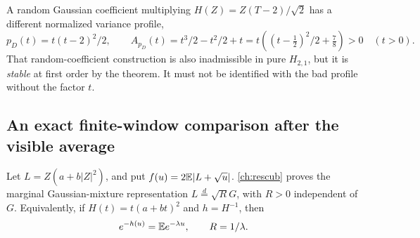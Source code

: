 A random Gaussian coefficient multiplying
\(H(Z)=Z(T-2)/\sqrt2\) has a different normalized variance profile,
\[
p_D(t)=t(t-2)^2/2,\qquad
A_{p_D}(t)=t^3/2-t^2/2+t
 =t\left((t-\tfrac12)^2/2+\tfrac78\right)>0\quad(t>0).
\]
That random-coefficient construction is also inadmissible in pure
\(H_{2,1}\), but it is \emph{stable} at first order by the theorem.
It must not be identified with the bad profile without the factor \(t\).

\subsection{An exact finite-window comparison after the visible average}
\label{avg:laplace}

Let \(L=Z(a+b|Z|^2)\), and put \(f(u)=2\mathbb E|L+\sqrt u|\).
\autoref{ch:rescub} proves the marginal Gaussian-mixture representation
\(L\stackrel d=\sqrt R G\), with \(R>0\) independent of \(G\).
Equivalently, if \(H(t)=t(a+bt)^2\) and \(h=H^{-1}\), then
\[
e^{-h(u)}=\mathbb E e^{-\lambda u},\qquad R=1/\lambda.
\]


